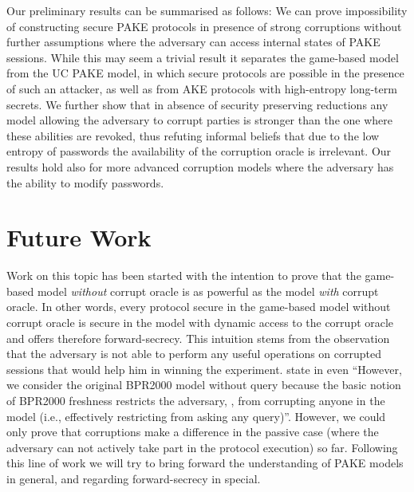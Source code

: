Our preliminary results can be summarised as follows:
We can prove impossibility of constructing secure \ac{PAKE} protocols in presence of strong corruptions without further assumptions where the adversary can access internal states of \ac{PAKE} sessions.
While this may seem a trivial result it separates the game-based model from the \ac{UC} \ac{PAKE} model, in which secure protocols are possible in the presence of such an attacker, as well as from \ac{AKE} protocols with high-entropy long-term secrets.
We further show that in absence of security preserving reductions any model allowing the adversary to corrupt parties is stronger than the one where these abilities are revoked, thus refuting informal beliefs that due to the low entropy of passwords the availability of the corruption oracle is irrelevant.
Our results hold also for more advanced corruption models where the adversary has the ability to modify passwords.

\section{Future Work}
Work on this topic has been started with the intention to prove that the game-based model \emph{without} corrupt oracle is as powerful as the model \emph{with} corrupt oracle.
In other words, every protocol secure in the game-based model without corrupt oracle is secure in the model with dynamic access to the corrupt oracle and offers therefore forward-secrecy.
This intuition stems from the observation that the adversary is not able to perform any useful operations on corrupted sessions that would help him in winning the experiment.
\citeauthor{ChooBH05} state in \cite{ChooBH05} even ``However, we consider the original BPR2000 model without \Corrupt query because the basic notion of BPR2000 freshness restricts the adversary, \cA, from corrupting anyone in the model (i.e., effectively restricting \cA from asking any \Corrupt query)''.
However, we could only prove that corruptions make a difference in the passive case (where the adversary can not actively take part in the protocol execution) so far.
Following this line of work we will try to bring forward the understanding of \ac{PAKE} models in general, and regarding forward-secrecy in special.
